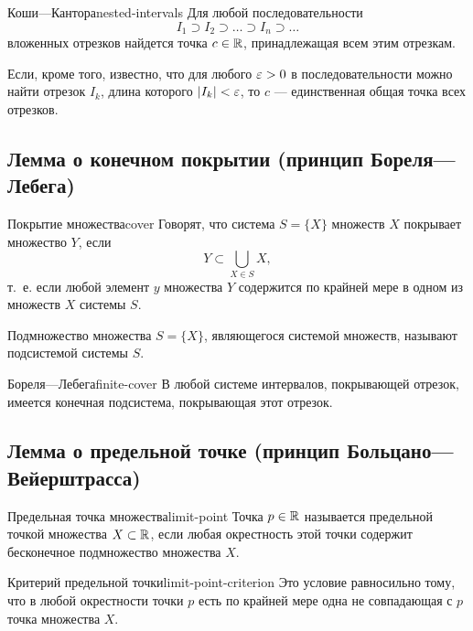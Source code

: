 \begin{lemma}{Коши—Кантора}{nested-intervals}
  Для любой последовательности
  \[
    I_1\supset I_2\supset\ldots\supset I_n\supset\ldots
  \]
  вложенных отрезков найдется точка $c\in\mathbb{R}$, принадлежащая всем этим
  отрезкам.

  Если, кроме того, известно, что для любого $\varepsilon>0$ в последовательности
  можно найти отрезок $I_k$, длина которого $|I_k|<\varepsilon$, то $c$ —
  единственная общая точка всех отрезков.
\end{lemma}

\subsection{Лемма о конечном покрытии (принцип Бореля—Лебега)}

\begin{definition}{Покрытие множества}{cover}
  Говорят, что система $S=\{X\}$ множеств $X$ покрывает множество $Y$, если
  \[
    Y\subset\bigcup_{X\in S}X,
  \]
  т.~е. если любой элемент $y$ множества $Y$ содержится по крайней мере в
  одном из множеств $X$ системы $S$.

  Подмножество множества $S=\{X\}$, являющегося системой множеств, называют
  подсистемой системы $S$.
\end{definition}

\begin{lemma}{Бореля—Лебега}{finite-cover}
  В любой системе интервалов, покрывающей отрезок, имеется конечная
  подсистема, покрывающая этот отрезок.
\end{lemma}

\subsection{Лемма о предельной точке (принцип Больцано—Вейерштрасса)}

\begin{definition}{Предельная точка множества}{limit-point}
  Точка $p\in\mathbb{R}$ называется предельной точкой множества $X\subset\mathbb{R}$, если
  любая окрестность этой точки содержит бесконечное подмножество множества
  $X$.
\end{definition}

\begin{properties}{Критерий предельной точки}{limit-point-criterion}
  Это условие равносильно тому, что в любой окрестности точки $p$ есть по
  крайней мере одна не совпадающая с $p$ точка множества $X$.
\end{properties}

